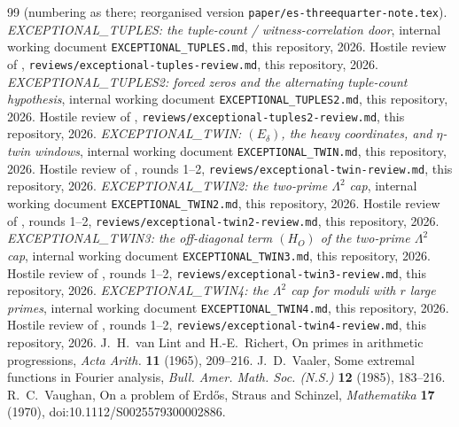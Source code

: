 \documentclass[10pt,reqno]{amsart}
\theoremstyle{definition}
\theoremstyle{remark}
\begin{document}
\begin{thebibliography}{99}
(numbering as there; reorganised version
\texttt{paper/es-threequarter-note.tex}).
\emph{EXCEPTIONAL\_TUPLES: the tuple-count / witness-correlation door},
internal working document \texttt{EXCEPTIONAL\_TUPLES.md}, this
repository, 2026.
Hostile review of \cite{TU}, \texttt{reviews/exceptional-tuples-review.md},
this repository, 2026.
\emph{EXCEPTIONAL\_TUPLES2: forced zeros and the alternating tuple-count
hypothesis}, internal working document
\texttt{EXCEPTIONAL\_TUPLES2.md}, this repository, 2026.
Hostile review of \cite{TU2}, \texttt{reviews/exceptional-tuples2-review.md},
this repository, 2026.
\emph{EXCEPTIONAL\_TWIN: $(E_\delta)$, the heavy coordinates, and
$\eta$-twin windows}, internal working document
\texttt{EXCEPTIONAL\_TWIN.md}, this repository, 2026.
Hostile review of \cite{TW}, rounds 1--2,
\texttt{reviews/exceptional-twin-review.md}, this repository, 2026.
\emph{EXCEPTIONAL\_TWIN2: the two-prime $\Lambda^2$ cap}, internal working
document \texttt{EXCEPTIONAL\_TWIN2.md}, this repository, 2026.
Hostile review of \cite{TW2}, rounds 1--2,
\texttt{reviews/exceptional-twin2-review.md}, this repository, 2026.
\emph{EXCEPTIONAL\_TWIN3: the off-diagonal term $(H_O)$ of the two-prime
$\Lambda^2$ cap}, internal working document \texttt{EXCEPTIONAL\_TWIN3.md},
this repository, 2026.
Hostile review of \cite{TW3}, rounds 1--2,
\texttt{reviews/exceptional-twin3-review.md}, this repository, 2026.
\emph{EXCEPTIONAL\_TWIN4: the $\Lambda^2$ cap for moduli with $r$ large
primes}, internal working document \texttt{EXCEPTIONAL\_TWIN4.md}, this
repository, 2026.
Hostile review of \cite{TW4}, rounds 1--2,
\texttt{reviews/exceptional-twin4-review.md}, this repository, 2026.
J.~H.~van Lint and H.-E.~Richert, On primes in arithmetic progressions,
\emph{Acta Arith.} \textbf{11} (1965), 209--216.
J.~D.~Vaaler, Some extremal functions in Fourier analysis,
\emph{Bull. Amer. Math. Soc. (N.S.)} \textbf{12} (1985), 183--216.
R.~C.~Vaughan, On a problem of Erd\H{o}s, Straus and Schinzel,
\emph{Mathematika} \textbf{17} (1970), doi:10.1112/S0025579300002886.
\end{thebibliography}
\end{document}
